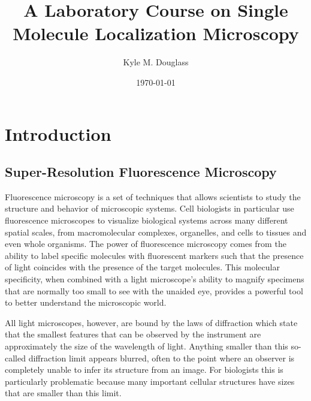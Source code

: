 \documentclass[10pt,a4paper]{book}
\title{A Laboratory Course on Single Molecule Localization Microscopy}
\author{Kyle M. Douglass}
\date{\today}
\begin{document}
\maketitle

\chapter{Introduction}

\section{Super-Resolution Fluorescence Microscopy}

Fluorescence microscopy is a set of techniques that allows scientists to study the structure and behavior of microscopic systems. Cell biologists in particular use fluorescence microscopes to visualize biological systems across many different spatial scales, from macromolecular complexes, organelles, and cells to tissues and even whole organisms. The power of fluorescence microscopy comes from the ability to label specific molecules with fluorescent markers such that the presence of light coincides with the presence of the target molecules. This molecular specificity, when combined with a light microscope's ability to magnify specimens that are normally too small to see with the unaided eye, provides a powerful tool to better understand the microscopic world.

All light microscopes, however, are bound by the laws of diffraction which state that the smallest features that can be observed by the instrument are approximately the size of the wavelength of light. Anything smaller than this so-called diffraction limit appears blurred, often to the point where an observer is completely unable to infer its structure from an image. For biologists this is particularly problematic because many important cellular structures have sizes that are smaller than this limit.
\end{document}
